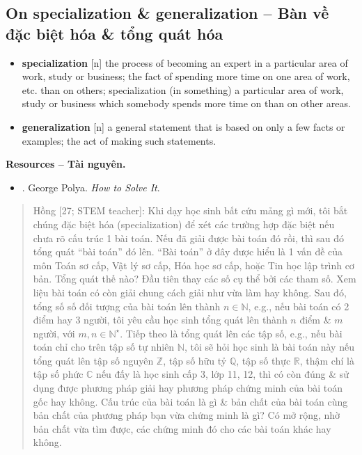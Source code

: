 \documentclass[12pt]{article}
\begin{document}
\subsection{On specialization \& generalization -- Bàn về đặc biệt hóa \& tổng quát hóa}

\begin{itemize}\sf\small
	\item \textbf{specialization} [n] the process of becoming an expert in a particular area of work, study or business; the fact of spending more time on one area of work, etc. than on others; specialization (in something) a particular area of work, study or business which somebody spends more time on than on other areas.
	\item \textbf{generalization} [n] a general statement that is based on only a few facts or examples; the act of making such statements.
\end{itemize}

\noindent\textbf{\textsf{Resources -- Tài nguyên.}}
\begin{itemize}
	\item \cite{Polya2014}. George Polya. {\it How to Solve It}.
\end{itemize}
\begin{quote}
	{\sf Hồng [27; STEM teacher]}: Khi dạy học sinh bất cứu mảng gì mới, tôi bắt chúng đặc biệt hóa (specialization) để xét các trường hợp đặc biệt nếu chưa rõ cấu trúc 1 bài toán. Nếu đã giải được bài toán đó rồi, thì sau đó tổng quát ``bài toán'' đó lên. ``Bài toán'' ở đây được hiểu là 1 vấn đề của môn Toán sơ cấp, Vật lý sơ cấp, Hóa học sơ cấp, hoặc Tin học lập trình cơ bản. Tổng quát thế nào? Đầu tiên thay các số cụ thể bởi các tham số. Xem liệu bài toán có còn giải chung cách giải như vừa làm hay không. Sau đó, tổng số số đối tượng của bài toán lên thành $n\in\mathbb{N}$, e.g., nếu bài toán có 2 điểm hay 3 người, tôi yêu cầu học sinh tổng quát lên thành $n$ điểm \& $m$ người, với $m,n\in\mathbb{N}^\star$. Tiếp theo là tổng quát lên các tập số, e.g., nếu bài toán chỉ cho trên tập số tự nhiên $\mathbb{N}$, tôi sẽ hỏi học sinh là bài toán này nếu tổng quát lên tập số nguyên $\mathbb{Z}$, tập số hữu tỷ $\mathbb{Q}$, tập số thực $\mathbb{R}$, thậm chí là tập số phức $\mathbb{C}$ nếu đấy là học sinh cấp 3, lớp 11, 12, thì có còn đúng \& sử dụng được phương pháp giải hay phương pháp chứng minh của bài toán gốc hay không. Cấu trúc của bài toán là gì \& bản chất của bài toán cùng bản chất của phương pháp bạn vừa chứng minh là gì? Có mở rộng, nhờ bản chất vừa tìm được, các chứng minh đó cho các bài toán khác hay không.
\end{quote}
\end{document}
